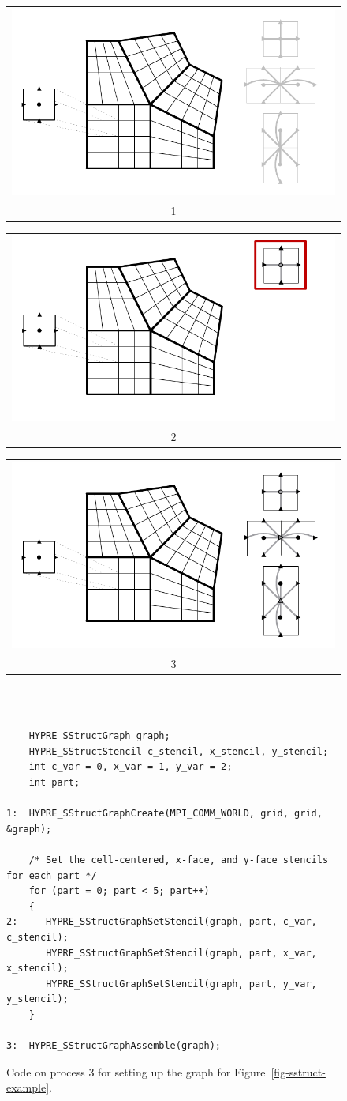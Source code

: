 \begin{figure}
\centering
\begin{tabular}{@{}c@{}}
\includegraphics[width=.32\textwidth]{figSStructGraph1}\vspace{-.5em} \\ 1
\end{tabular}
\hfill
\begin{tabular}{@{}c@{}}
\includegraphics[width=.32\textwidth]{figSStructGraph2}\vspace{-.5em} \\ 2
\end{tabular}
\hfill
\begin{tabular}{@{}c@{}}
\includegraphics[width=.32\textwidth]{figSStructGraph5}\vspace{-.5em} \\ 3
\end{tabular}
\vspace{1em} \\
\begin{minipage}{0.9\textwidth}
\begin{verbatim}
    
    HYPRE_SStructGraph graph;
    HYPRE_SStructStencil c_stencil, x_stencil, y_stencil;
    int c_var = 0, x_var = 1, y_var = 2;
    int part;
    
1:  HYPRE_SStructGraphCreate(MPI_COMM_WORLD, grid, grid, &graph);
    
    /* Set the cell-centered, x-face, and y-face stencils for each part */
    for (part = 0; part < 5; part++)
    {
2:     HYPRE_SStructGraphSetStencil(graph, part, c_var, c_stencil);
       HYPRE_SStructGraphSetStencil(graph, part, x_var, x_stencil);
       HYPRE_SStructGraphSetStencil(graph, part, y_var, y_stencil);
    }
    
3:  HYPRE_SStructGraphAssemble(graph);

\end{verbatim}
\end{minipage}
\caption{%
Code on process 3 for setting up the graph for Figure~\ref{fig-sstruct-example}.}
\label{fig-sstruct-graph}
\end{figure}

